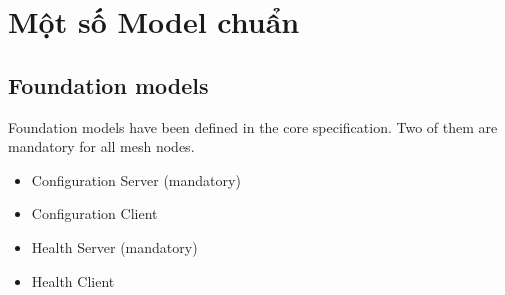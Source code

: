 \appendix
\chapter{Một số Model chuẩn}\label{models}

\section{Foundation models}
Foundation models have been defined in the core specification. Two of them are mandatory for all mesh nodes.

\begin{itemize}
	\item Configuration Server (mandatory)
	\item Configuration Client
	\item Health Server (mandatory)
	\item Health Client
\end{itemize}
